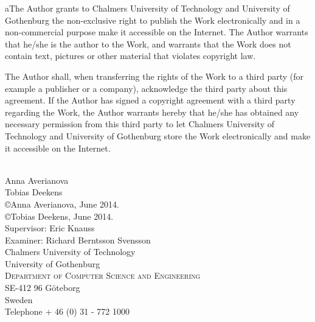 \begin{author}
aThe Author grants to Chalmers University of Technology and University of Gothenburg  the non-exclusive right to publish the Work electronically and in a non-commercial purpose make it accessible on the Internet. 
The Author warrants that he/she is the author to the Work, and warrants that the Work does not contain text, pictures or other material that violates copyright law. 

The Author shall, when transferring the rights of the Work to a third party (for example a publisher or a company), acknowledge the third party about this agreement. If the Author has signed a copyright agreement with a third party regarding the Work, the Author warrants hereby that he/she has obtained any necessary permission from this third party to let Chalmers University of Technology and University of Gothenburg  store the Work electronically and make it accessible on the Internet. 
  
  \begin{flushleft}
    {} \\[0.5cm]
  
    Anna Averianova \\[.2cm]
    Tobias Deekens \\[.5cm]
  
    {\copyright Anna Averianova, June 2014.}\\[.2cm]
    {\copyright Tobias Deekens, June 2014.}\\[.5cm]
    
    Supervisor: Eric Knauss \\[.2cm] 
    Examiner: Richard Berntsson Svensson \\[.5cm]
          
    {\Large Chalmers University of Technology  \\
      University of Gothenburg  \\
      \textsc{Department of Computer Science and Engineering} \\
      SE-412 96 Göteborg \\
      Sweden \\
      Telephone + 46 (0) 31 - 772 1000 \\
    } 
  \end{flushleft} 
\end{author}

\newpage
\clearpage
\thispagestyle{empty}

